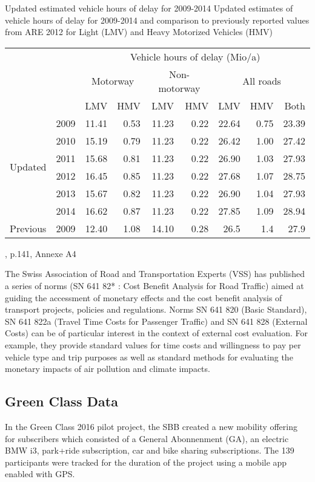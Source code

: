 \createtable%
{Updated estimated vehicle hours of delay for 2009-2014}%
{Updated estimates of vehicle hours of delay for 2009-2014 and comparison to previously reported values from ARE 2012 for Light (LMV) and Heavy Motorized Vehicles (HMV)}%
{\label{tab:vehHoursDelayMkInfras}}%
{%
  \begin{tabular}[c]{lrrrrrrrr}
    \toprule
    \multirow{3}{*}{} & & \multicolumn{7}{c}{Vehicle hours of delay (Mio/a)}\\ 
    & & \multicolumn{2}{c}{Motorway} & \multicolumn{2}{c}{Non-motorway} & \multicolumn{3}{c}{All roads}\\
    & &  LMV & HMV & LMV & HMV & LMV & HMV & Both\\
    \midrule
    \multirow{6}{*}{Updated}
    & 2009 & 11.41 & 0.53 & 11.23 & 0.22 & 22.64 & 0.75 & 23.39 \\
	& 2010 & 15.19 & 0.79 & 11.23 & 0.22 & 26.42 & 1.00 & 27.42 \\
	& 2011 & 15.68 & 0.81 & 11.23 & 0.22 & 26.90 & 1.03 & 27.93 \\
	& 2012 & 16.45 & 0.85 & 11.23 & 0.22 & 27.68 & 1.07 & 28.75 \\
	& 2013 & 15.67 & 0.82 & 11.23 & 0.22 & 26.90 & 1.04 & 27.93 \\
	& 2014 & 16.62 & 0.87 & 11.23 & 0.22 & 27.85 & 1.09 & 28.94 \\
	\midrule
	Previous & 2009 & 12.40 & 1.08 & 14.10 & 0.28 & 26.5 & 1.4 & 27.9 \\
    \bottomrule
  \end{tabular}
}%
{\cite{mkinfras2016staukosten}, p.141, Annexe A4}

The Swiss Association of Road and Transportation Experts (VSS) has published a series of norms (SN 641 82* : Cost Benefit Analysis
for Road Traffic) aimed at guiding the accessment of monetary effects and the cost benefit analysis of transport projects, policies and regulations.
Norms SN 641 820 (Basic Standard), SN 641 822a (Travel Time Costs for Passenger Traffic) and SN 641 828 (External Costs) can be of particular interest in the context of external cost evaluation.
For example, they provide standard values for time costs and willingness to pay per vehicle type and trip purposes as well as standard methods for evaluating the monetary impacts of air pollution and climate impacts.
 

\subsection{Green Class Data}
In the Green Class 2016 pilot project, the SBB created a new mobility offering for subscribers which consisted of a General Abonnenment (GA), an electric BMW i3, park+ride subscription, car and bike sharing subscriptions.
The 139 participants were tracked for the duration of the project using a mobile app enabled with GPS.

